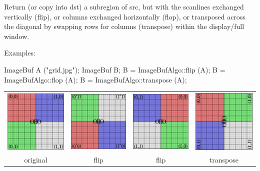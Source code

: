 Return (or copy into {\cf dst}) a subregion of {\cf src}, but with the
scanlines exchanged vertically (flip), or columns exchanged horizontally
(flop), or transposed across the diagonal by swapping rows for columns
(transpose) within the display/full window.

\smallskip
\noindent Examples:
\begin{code}
    ImageBuf A ("grid.jpg");
    ImageBuf B;
    B = ImageBufAlgo::flip (A);
    B = ImageBufAlgo::flop (A);
    B = ImageBufAlgo::transpose (A);
\end{code}

\noindent \begin{tabular}{cccc}
\includegraphics[width=1.25in]{figures/grid-small.jpg} &
\includegraphics[width=1.25in]{figures/flip.jpg} &
\includegraphics[width=1.25in]{figures/flop.jpg} &
\includegraphics[width=1.25in]{figures/transpose.jpg} \\
original & flip & flip & transpose
\end{tabular}
\apiend


 

